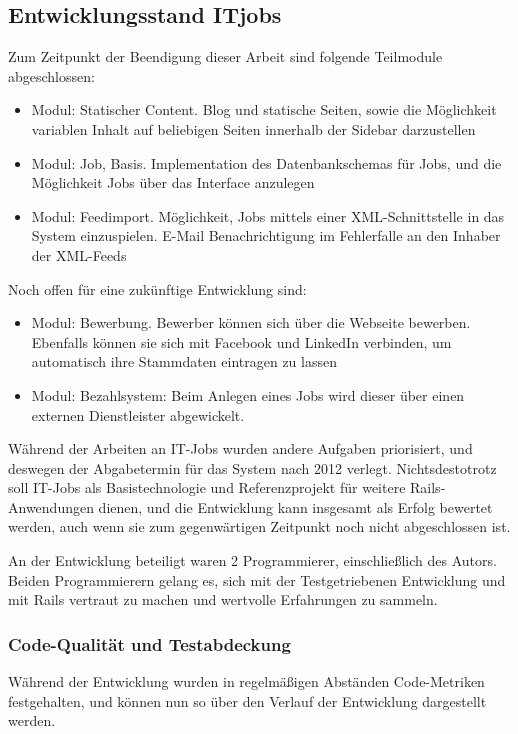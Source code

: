 \subsection{Entwicklungsstand ITjobs}
Zum Zeitpunkt der Beendigung dieser Arbeit sind folgende Teilmodule abgeschlossen:
\begin{itemize}
 \item Modul: Statischer Content. Blog und statische Seiten, sowie die Möglichkeit variablen Inhalt auf beliebigen Seiten innerhalb der Sidebar darzustellen
 \item Modul: Job, Basis. Implementation des Datenbankschemas für Jobs, und die Möglichkeit Jobs über das Interface anzulegen
 \item Modul: Feedimport. Möglichkeit, Jobs mittels einer XML-Schnittstelle in das System einzuspielen. E-Mail Benachrichtigung im Fehlerfalle an den Inhaber der XML-Feeds
\end{itemize}
Noch offen für eine zukünftige Entwicklung sind:
\begin{itemize}
 \item Modul: Bewerbung. Bewerber können sich über die Webseite bewerben. Ebenfalls können sie sich mit Facebook und LinkedIn verbinden, um automatisch ihre Stammdaten eintragen zu lassen
 \item Modul: Bezahlsystem: Beim Anlegen eines Jobs wird dieser über einen externen Dienstleister abgewickelt.
\end{itemize}

Während der Arbeiten an IT-Jobs wurden andere Aufgaben priorisiert, und deswegen der Abgabetermin für das System nach 2012 verlegt. Nichtsdestotrotz soll IT-Jobs als Basistechnologie und Referenzprojekt für weitere Rails-Anwendungen dienen, und die Entwicklung kann insgesamt als Erfolg bewertet werden, auch wenn sie zum gegenwärtigen Zeitpunkt noch nicht abgeschlossen ist.

An der Entwicklung beteiligt waren 2 Programmierer, einschließlich des Autors. Beiden Programmierern gelang es, sich mit der Testgetriebenen Entwicklung und mit Rails vertraut zu machen und wertvolle Erfahrungen zu sammeln. 

\subsubsection*{Code-Qualität und Testabdeckung}
Während der Entwicklung wurden in regelmäßigen Abständen Code-Metriken festgehalten, und können nun so über den Verlauf der Entwicklung dargestellt werden. 

